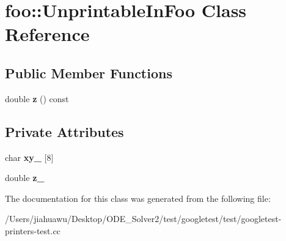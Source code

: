 \hypertarget{classfoo_1_1_unprintable_in_foo}{}\section{foo\+:\+:Unprintable\+In\+Foo Class Reference}
\label{classfoo_1_1_unprintable_in_foo}
\subsection*{Public Member Functions}
\begin{DoxyCompactItemize}
\item 
\mbox{\label{classfoo_1_1_unprintable_in_foo_a3dc8c8e90906bb6f3376474d545e488c}} 
double {\bfseries z} () const
\end{DoxyCompactItemize}
\subsection*{Private Attributes}
\begin{DoxyCompactItemize}
\item 
\mbox{\label{classfoo_1_1_unprintable_in_foo_a254a8fbb1e51db1ef98fadcad88e7819}} 
char {\bfseries xy\+\_\+} \mbox{[}8\mbox{]}
\item 
\mbox{\label{classfoo_1_1_unprintable_in_foo_a48136583cf853dcb112f46d33eb7b8eb}} 
double {\bfseries z\+\_\+}
\end{DoxyCompactItemize}


The documentation for this class was generated from the following file\+:\begin{DoxyCompactItemize}
\item 
/\+Users/jiahuawu/\+Desktop/\+O\+D\+E\+\_\+\+Solver2/test/googletest/test/googletest-\/printers-\/test.\+cc\end{DoxyCompactItemize}
